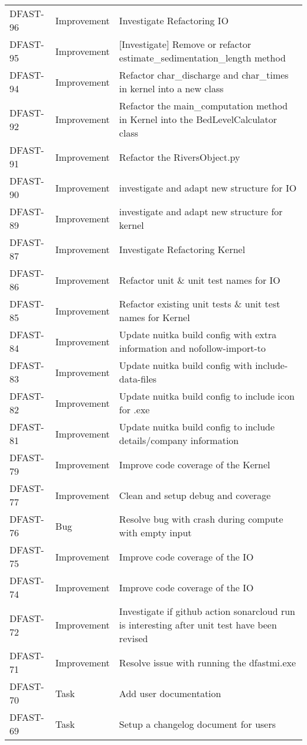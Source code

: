 \documentclass[git]{deltares_manual}
\begin{document}
\begin{longtable}{l|l|p{8cm}}
DFAST-96 & Improvement & Investigate Refactoring IO \\
DFAST-95 & Improvement & [Investigate] Remove or refactor estimate\_sedimentation\_length method \\
DFAST-94 & Improvement & Refactor char\_discharge and char\_times in kernel into a new class \\
DFAST-92 & Improvement & Refactor the main\_computation method in Kernel into the BedLevelCalculator class \\
DFAST-91 & Improvement & Refactor the RiversObject.py \\
DFAST-90 & Improvement & investigate and adapt new structure for IO \\
DFAST-89 & Improvement & investigate and adapt new structure for kernel \\
DFAST-87 & Improvement & Investigate Refactoring Kernel \\
DFAST-86 & Improvement & Refactor unit \& unit test names for IO \\
DFAST-85 & Improvement & Refactor existing unit tests \& unit test names for Kernel \\
DFAST-84 & Improvement & Update nuitka build config with extra information and nofollow-import-to \\
DFAST-83 & Improvement & Update nuitka build config with include-data-files \\
DFAST-82 & Improvement & Update nuitka build config to include icon for .exe \\
DFAST-81 & Improvement & Update nuitka build config to include details/company information \\
DFAST-79 & Improvement & Improve code coverage of the Kernel  \\
DFAST-77 & Improvement & Clean and setup debug and coverage \\
DFAST-76 & Bug & Resolve bug with crash during compute with empty input \\
DFAST-75 & Improvement & Improve code coverage of the IO \\
DFAST-74 & Improvement & Improve code coverage of the IO  \\
DFAST-72 & Improvement & Investigate if github action sonarcloud run is interesting after unit test have been revised \\
DFAST-71 & Improvement & Resolve issue with running the dfastmi.exe \\
DFAST-70 & Task & Add user documentation \\
DFAST-69 & Task & Setup a changelog document for users \\

\end{longtable}
\end{document}

